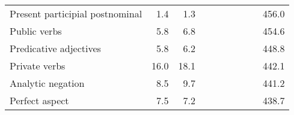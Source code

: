 \begin{table}[!t]
\begin{tabular*}{\linewidth}{@{\extracolsep{\fill}}lrrrrrrrrr}
Present participial postnominal & 1.4 & 1.3 & {\cellcolor[HTML]{4393C3}{\textcolor[HTML]{FFFFFF}{293\%}}} & {\cellcolor[HTML]{4393C3}{\textcolor[HTML]{FFFFFF}{243\%}}} & {\cellcolor[HTML]{D1E5F0}{\textcolor[HTML]{000000}{125\%}}} & {\cellcolor[HTML]{D1E5F0}{\textcolor[HTML]{000000}{124\%}}} & {\cellcolor[HTML]{F7F7F7}{\textcolor[HTML]{000000}{101\%}}} & {\cellcolor[HTML]{D1E5F0}{\textcolor[HTML]{000000}{113\%}}} & 456.0 \\ 
Public verbs & 5.8 & 6.8 & {\cellcolor[HTML]{F4A582}{\textcolor[HTML]{000000}{53\%}}} & {\cellcolor[HTML]{F4A582}{\textcolor[HTML]{000000}{63\%}}} & {\cellcolor[HTML]{F4A582}{\textcolor[HTML]{000000}{65\%}}} & {\cellcolor[HTML]{F4A582}{\textcolor[HTML]{000000}{67\%}}} & {\cellcolor[HTML]{D1E5F0}{\textcolor[HTML]{000000}{119\%}}} & {\cellcolor[HTML]{D1E5F0}{\textcolor[HTML]{000000}{112\%}}} & 454.6 \\ 
Predicative adjectives & 5.8 & 6.2 & {\cellcolor[HTML]{FDDBC7}{\textcolor[HTML]{000000}{84\%}}} & {\cellcolor[HTML]{F7F7F7}{\textcolor[HTML]{000000}{90\%}}} & {\cellcolor[HTML]{92C5DE}{\textcolor[HTML]{000000}{140\%}}} & {\cellcolor[HTML]{D1E5F0}{\textcolor[HTML]{000000}{131\%}}} & {\cellcolor[HTML]{92C5DE}{\textcolor[HTML]{000000}{169\%}}} & {\cellcolor[HTML]{92C5DE}{\textcolor[HTML]{000000}{154\%}}} & 448.8 \\ 
Private verbs & 16.0 & 18.1 & {\cellcolor[HTML]{F7F7F7}{\textcolor[HTML]{000000}{91\%}}} & {\cellcolor[HTML]{FDDBC7}{\textcolor[HTML]{000000}{85\%}}} & {\cellcolor[HTML]{D1E5F0}{\textcolor[HTML]{000000}{122\%}}} & {\cellcolor[HTML]{D1E5F0}{\textcolor[HTML]{000000}{113\%}}} & {\cellcolor[HTML]{D1E5F0}{\textcolor[HTML]{000000}{128\%}}} & {\cellcolor[HTML]{D1E5F0}{\textcolor[HTML]{000000}{126\%}}} & 442.1 \\ 
Analytic negation & 8.5 & 9.7 & {\cellcolor[HTML]{F4A582}{\textcolor[HTML]{000000}{73\%}}} & {\cellcolor[HTML]{F4A582}{\textcolor[HTML]{000000}{61\%}}} & {\cellcolor[HTML]{FDDBC7}{\textcolor[HTML]{000000}{80\%}}} & {\cellcolor[HTML]{FDDBC7}{\textcolor[HTML]{000000}{78\%}}} & {\cellcolor[HTML]{D1E5F0}{\textcolor[HTML]{000000}{113\%}}} & {\cellcolor[HTML]{F7F7F7}{\textcolor[HTML]{000000}{107\%}}} & 441.2 \\ 
Perfect aspect & 7.5 & 7.2 & {\cellcolor[HTML]{F4A582}{\textcolor[HTML]{000000}{62\%}}} & {\cellcolor[HTML]{F4A582}{\textcolor[HTML]{000000}{60\%}}} & {\cellcolor[HTML]{D1E5F0}{\textcolor[HTML]{000000}{121\%}}} & {\cellcolor[HTML]{D1E5F0}{\textcolor[HTML]{000000}{111\%}}} & {\cellcolor[HTML]{F7F7F7}{\textcolor[HTML]{000000}{96\%}}} & {\cellcolor[HTML]{F7F7F7}{\textcolor[HTML]{000000}{92\%}}} & 438.7 \\ 

\end{tabular*}
\end{table}
